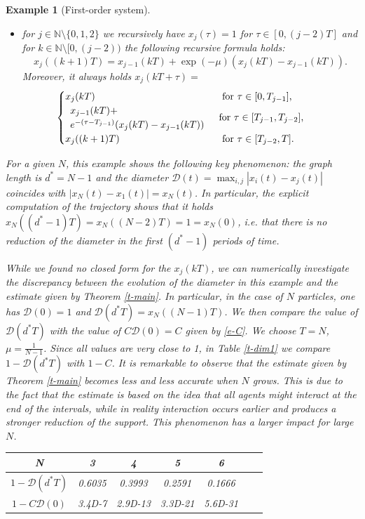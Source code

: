 \documentclass[journal]{article}
\newtheorem{example}{Example}
\newcommand{\D}{\mathcal{D}}
\begin{document}
\begin{example}[First-order system]
\begin{itemize}
\item for $j\in\mathbb{N}\setminus\{0,1,2\}$ we recursively have $x_j(\tau)=1$ for $\tau\in[0,(j-2)T]$ and for $k\in\mathbb{N}\setminus[0,(j-2))$ the following recursive formula holds:
\begin{equation}
x_j((k+1)T)=x_{j-1}(kT)+\exp(-\mu)(x_j(kT)-x_{j-1}(kT)).
\label{e-xjkT}
\end{equation}
Moreover, it always holds
$x_j(kT+\tau)=$
$$\hspace{-7mm}\begin{cases}
x_j(kT)&\mbox{ for $\tau\in[0,T_{j-1}]$,}\\
\begin{array}{l}x_{j-1}(kT)+\\
e^{-(\tau-T_{j-1})}(x_j(kT)-x_{j-1}(kT))\end{array}&\mbox{for $\tau\in[T_{j-1},T_{j-2}]$,}\\
x_j((k+1)T)&\mbox{ for $\tau\in[T_{j-2},T]$.}
\end{cases}$$
\end{itemize}

For a given $N$, this example shows the following key phenomenon: the graph length is $d^*=N-1$ and the diameter $\D(t)=\max_{i,j}|x_i(t)-x_j(t)|$ coincides with $|x_N(t)-x_1(t)|=x_N(t)$. In particular, the explicit computation of the trajectory shows that it holds $x_N((d^*-1)T)=x_N((N-2)T)=1=x_N(0)$, i.e. that there is no reduction of the diameter in the first $(d^*-1)$ periods of time.

While we found no closed form for the $x_j(kT)$, we can numerically investigate the discrepancy between the evolution of the diameter in this example and the estimate given by Theorem \ref{t-main}. In particular, in the case of $N$ particles, one has $\D(0)=1$ and $\D(d^*T)=x_N((N-1)T)$. We then compare the value of $\D(d^*T)$ with the value of $C\D(0)=C$ given by \eqref{e-C}. We choose $T=N$, $\mu=\frac{1}{N-1}$. Since all values are very close to 1, in Table \ref{t-dim1} we compare  $1-\D(d^*T)$ with $1-C$. It is remarkable to observe that the estimate given by Theorem \ref{t-main} becomes less and less accurate when $N$ grows. This is due to the fact that the estimate is based on the idea that all agents might interact at the end of the intervals, while in reality interaction occurs earlier and produces a stronger reduction of the support. This phenomenon has a larger impact for large $N$.

\begin{table}[htb]
\begin{centering}
\begin{tabular}{|c||c|c|c|c|c|c|}\hline
N & 3&4&5&6\\\hline
$1-\D(d^*T)$ &0.6035  & 0.3993&      0.2591  &   0.1666   \\\hline
$1-C\D(0)$ & 3.4D-7&   2.9D-13 & 3.3D-21&  5.6D-31    \\\hline
\end{tabular}


\end{centering}
\end{table}
\end{example}
\end{document}
